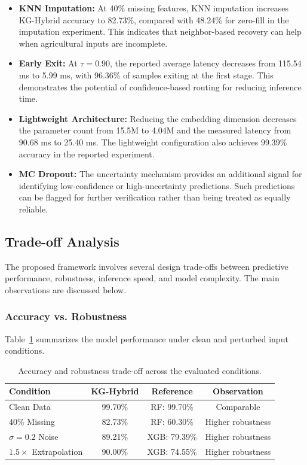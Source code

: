 \documentclass[journal]{IEEEtran}
\begin{document}
\begin{itemize}[leftmargin=1.2em]
    \item \textbf{KNN Imputation:} At 40\% missing features, KNN imputation increases KG-Hybrid accuracy to 82.73\%, compared with 48.24\% for zero-fill in the imputation experiment. This indicates that neighbor-based recovery can help when agricultural inputs are incomplete.

    \item \textbf{Early Exit:} At $\tau=0.90$, the reported average latency decreases from 115.54 ms to 5.99 ms, with 96.36\% of samples exiting at the first stage. This demonstrates the potential of confidence-based routing for reducing inference time.

    \item \textbf{Lightweight Architecture:} Reducing the embedding dimension decreases the parameter count from 15.5M to 4.04M and the measured latency from 90.68 ms to 25.40 ms. The lightweight configuration also achieves 99.39\% accuracy in the reported experiment.

    \item \textbf{MC Dropout:} The uncertainty mechanism provides an additional signal for identifying low-confidence or high-uncertainty predictions. Such predictions can be flagged for further verification rather than being treated as equally reliable.
\end{itemize}
\subsection{Trade-off Analysis}

The proposed framework involves several design trade-offs between predictive performance, robustness, inference speed, and model complexity. The main observations are discussed below.

\subsubsection{Accuracy vs. Robustness}

Table~\ref{tab:accuracy_robustness_tradeoff} summarizes the model performance under clean and perturbed input conditions.

\begin{table}[t]
\centering
\caption{Accuracy and robustness trade-off across the evaluated conditions.}
\label{tab:accuracy_robustness_tradeoff}
\begin{tabular}{lccc}
\hline
\textbf{Condition} & \textbf{KG-Hybrid} & \textbf{Reference} & \textbf{Observation} \\
\hline
Clean Data & 99.70\% & RF: 99.70\% & Comparable \\
40\% Missing & 82.73\% & RF: 60.30\% & Higher robustness \\
$\sigma=0.2$ Noise & 89.21\% & XGB: 79.39\% & Higher robustness \\
$1.5\times$ Extrapolation & 90.00\% & XGB: 74.55\% & Higher robustness \\
\hline
\end{tabular}
\end{table}
\end{document}
